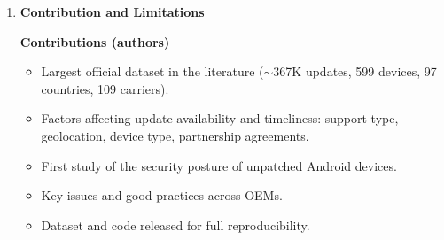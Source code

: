 \documentclass[11pt,a4paper]{article}
\newcommand{\entrypart}[1]{\textbf{\color{accent}#1}\par\vspace{2pt}}
\begin{document}
\begin{enumerate}
\begin{itemize}
\begin{itemize}
            \item \textbf{Support lists:} Galaxy A7 (2018) pair stopped updates 1272 days before leaving the list. Oppo Reno4 models in 16 countries: no updates since 2020.
            \item \textbf{AER:} of 5125 Samsung AER pairs, 94\% (4835) updated in last two months. But 201 pairs none in a year, 58 in two years, 15 in three years.
            \item \textbf{Misleading announcements:} ``at least four years'' list (85 devices, 8033 pairs): 343 pairs had no update in the last year.
        \end{itemize}
        \item \textbf{Good practices:} guaranteed support date (Google, Motorola; FTC recommends it), EOS lists (Motorola, Xiaomi), model-level support lists (Oppo).
    \end{itemize}

    \item \entrypart{Contribution and Limitations}

    \textbf{Contributions (authors)}
    \begin{itemize}
        \item Largest official dataset in the literature ($\sim$367K updates, 599 devices, 97 countries, 109 carriers).
        \item Factors affecting update availability and timeliness: support type, geolocation, device type, partnership agreements.
        \item First study of the security posture of unpatched Android devices.
        \item Key issues and good practices across OEMs.
        \item Dataset and code released for full reproducibility.
    \end{itemize}


\end{enumerate}
\end{document}
